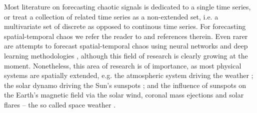 \documentclass[journal]{IEEEtran}
\begin{document}
Most literature on forecasting chaotic signals is dedicated to a single time series, or treat a collection of related time series as a
non-extended set, i.e. a multivariate set of discrete as opposed to continous time series.
For forecasting spatial-temporal chaos we refer the reader to
\cite{doi:10.1063/1.165894,PhysRevE.51.R2709,PhysRevLett.85.2300,Parlitz2000NonlinearPO,2000PhRvL..84.1890P,Xia2006APF,covas2016}
and references therein.
Even rarer are attempts to forecast spatial-temporal chaos using neural networks and deep learning methodologies
\cite{covaspeixinhojoao,2017arXiv170805094M,2017arXiv171100636M,2017arXiv171110566R,2017arXiv171110561R,2017arXiv171009668L,
2018JCoPh.357..125R,2018arXiv180106637R}, although this field of research is clearly growing at the moment.
Nonetheless, this area of research is of importance, as most physical systems are spatially extended, e.g.
the atmospheric system driving the weather \cite{9780521857291}; the solar dynamo driving the Sun's sunspots \cite{9780198512905};
and the influence of sunspots on the Earth's magnetic field via the solar wind, coronal mass ejections and
solar flares -- the so called space weather \cite{1851RSPT..141..123S, 1852RSPT..142..103S,
1979P&SS...27.1001S,1983SoPh...89..195E,1965P&SS...13....9P,2000AdSpR..26...27W,2003A&AT...22..861B,2005GeoRL..3221106S,2005SpWea...3.8C01K,2006GMS...165..367T,2006GeoRL..3318101H,
2009SunGe...4...55C,2011SpWea...9.6001C,2013EGUGA..1510865W,2015SpWea..13..524S}.
\end{document}
